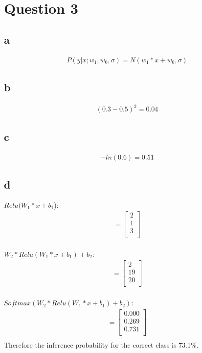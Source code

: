 \documentclass[12pt]{article}
\begin{document}
\section{Question 3}
\subsection{a}
\begin{align*}
    P(y|x;w_1, w_0, \sigma) = N(w_1*x + w_0, \sigma)
\end{align*}

\subsection{b}
\begin{align*}
    (0.3-0.5)^2 = 0.04
\end{align*}

\subsection{c}
\begin{align*}
    -ln(0.6) = 0.51
\end{align*}

\subsection{d}

$Relu(W_1*x + b_1$):
\begin{align*}
    = \begin{bmatrix}
        2 \\
        1 \\
        3 \\
    \end{bmatrix} \\
\end{align*}

$W_2*Relu(W_1*x+b_1)+b_2$:
\begin{align*}
    = \begin{bmatrix}
        2  \\
        19 \\
        20 \\
    \end{bmatrix} \\
\end{align*}

$Softmax(W_2*Relu(W_1*x+b_1)+b_2)$:
\begin{align*}
    = \begin{bmatrix}
        0.000 \\
        0.269 \\
        0.731 \\
    \end{bmatrix} \\
\end{align*}
Therefore the inference probability for the correct class is 73.1\%.
\end{document}
